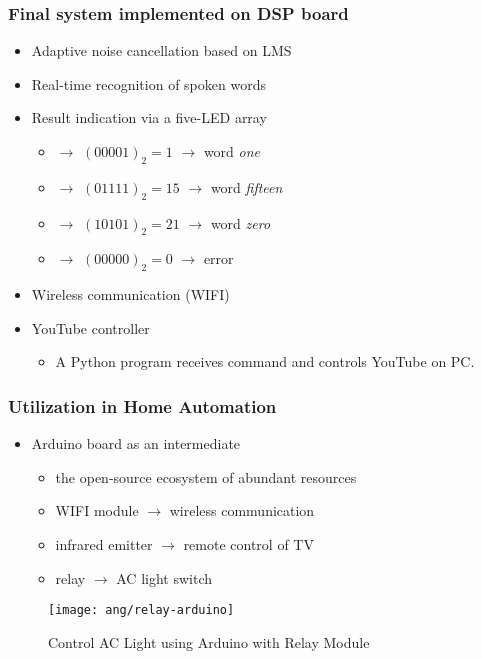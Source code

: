 
\begin{frame}
\frametitle{Final system implemented on DSP board}
\begin{itemize}
	\item Adaptive noise cancellation based on LMS
	\item Real-time recognition of spoken words
	\item Result indication via a five-LED array
		\begin{itemize}
		\item \LED\offLED\offLED\offLED\offLED\onLED $\longrightarrow$ $(00001)_2 = 1$ $\longrightarrow$ word \textit{one}
		\item \LED\offLED\onLED\onLED\onLED\onLED $\longrightarrow$ $(01111)_2 = 15$ $\longrightarrow$ word \textit{fifteen}
		\item \LED\onLED\offLED\onLED\offLED\onLED $\longrightarrow$ $(10101)_2 = 21$ $\longrightarrow$ word \textit{zero}
		\item \LED\offLED\offLED\offLED\offLED\offLED $\longrightarrow$ $(00000)_2 = 0$ $\longrightarrow$ error
		\end{itemize}
	\item Wireless communication (WIFI)
	\item YouTube controller
		\begin{itemize}
		\item A Python program receives command and controls YouTube on PC.
		\end{itemize}
\end{itemize}
\end{frame}


\begin{frame}
\frametitle{Utilization in Home Automation}
\begin{itemize}
	\item Arduino\textsuperscript{\textregistered} board as an intermediate
		\begin{itemize}
		\item the open-source ecosystem of abundant resources
		\item WIFI module $\longrightarrow$ wireless communication
		\item infrared emitter $\longrightarrow$ remote control of TV
		\item relay $\longrightarrow$ AC light switch
		\end{itemize}
\end{itemize}

\begin{figure}[H]
\centering
\texttt{[image: ang/relay-arduino]}
\caption{Control AC Light using Arduino with Relay Module \cite{relay-arduino}}
\end{figure}
\end{frame}
